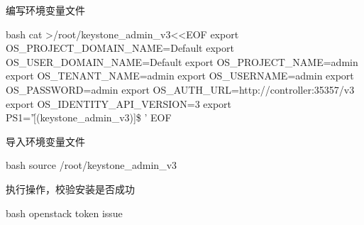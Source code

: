 编写环境变量文件

\begin{code-block}{bash}
cat >/root/keystone_admin_v3<<EOF
export OS_PROJECT_DOMAIN_NAME=Default
export OS_USER_DOMAIN_NAME=Default
export OS_PROJECT_NAME=admin
export OS_TENANT_NAME=admin
export OS_USERNAME=admin
export OS_PASSWORD=admin
export OS_AUTH_URL=http://controller:35357/v3
export OS_IDENTITY_API_VERSION=3
export PS1='[\u@\h \W(keystone_admin_v3)]\$ '
EOF
\end{code-block}

导入环境变量文件

\begin{code-block}{bash}
source /root/keystone_admin_v3
\end{code-block}

执行操作，校验安装是否成功

\begin{code-block}{bash}
openstack token issue
\end{code-block}
